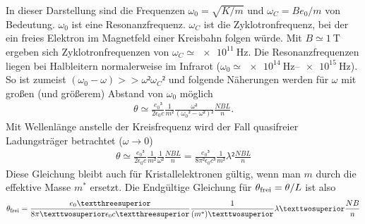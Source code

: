 In dieser Darstellung sind die Frequenzen $\omega_0 = \sqrt{K/m}$ und $\omega_C
	= Be_0/m$ von Bedeutung. $\omega_0$ ist eine Resonanzfrequenz. $\omega_C$ ist
die Zyklotronfrequenz, bei der ein freies Elektron im Magnetfeld einer
Kreisbahn folgen würde. Mit $B \simeq \qty{1}{\tesla}$ ergeben sich
Zyklotronfrequenzen von $\omega_C \simeq \qty{e11}{\hertz}$. Die
Resonanzfrequenzen liegen bei Halbleitern normalerweise im Infrarot ($\omega_0
	\simeq \qtyrange{e14}{e15}{\hertz}$). So ist zumeist $(\omega_0- \omega)>>
	\omega² \omega_C²$ und folgende Näherungen werden für $\omega$ mit großen (und
größerem) Abstand von $\omega_0$ möglich
\begin{align}
	\theta \simeq \frac{e_0³}{2\epsilon_0 c}\frac{1}{m²}\frac{\omega²}{(\omega_0²- \omega²)²}\frac{NBL}{n}.%
\end{align}
Mit Wellenlänge anstelle der Kreisfrequenz wird der Fall quasifreier Ladungsträger betrachtet ($\omega \rightarrow 0$)
\begin{align}
	\theta \simeq  \frac{e_0³}{2\epsilon_0 c}\frac{1}{m²}\frac{1}{\omega²}\frac{NBL}{n}%
	= \frac{e_0³}{8\pi²\epsilon_0 c³}\frac{1}{m²}\lambda²\frac{NBL}{n}
\end{align}
Diese Gleichung bleibt auch für Kristallelektronen gültig, wenn man $m$ durch die effektive Masse $m^*$ ersetzt.
Die Endgültige Gleichung für $\theta_\text{frei} = \theta / L$ ist also
\begin{align}
	\theta_\t{frei} = \frac{e_0³}{8\pi²\epsilon_0 c³}\frac{1}{(m^*)²}\lambda²\frac{NB}{n}
	\label{eq:theta_final}
\end{align}




